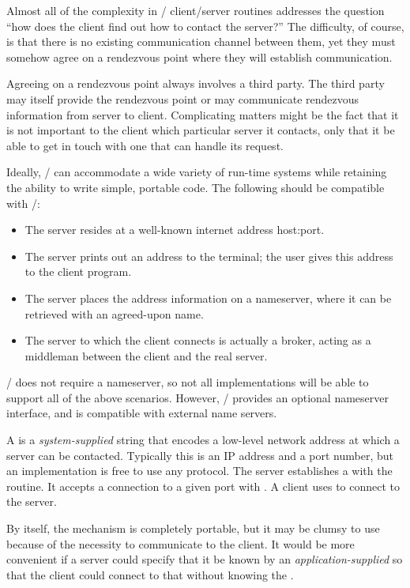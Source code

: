 Almost all of the complexity in \MPI/ client/server routines
addresses the question ``how does the client find out how
to contact the server?''
The difficulty, of course, is that there is no existing
communication channel between them, yet they must somehow agree
on a rendezvous point where they will establish communication.

Agreeing on a rendezvous point always involves a third party.
The third party may itself provide the rendezvous point or may
communicate rendezvous information from server to client.
Complicating
matters might be the fact that it is not important to the client
which particular server it contacts, only that it be able to get in touch
with one that can handle its request.

Ideally, \MPI/ can accommodate
 a wide variety of run-time systems while
retaining the ability to write simple, portable code. The following
should be compatible with \MPI/:

\begin{itemize}
\item The server resides at a well-known internet address host:port.
\item The server prints out an address to the terminal;
the user gives this address to the client program.
\item The server places the address information on a nameserver,
where it can be retrieved with an agreed-upon name.
\item The server to which the client connects is actually
a broker, acting as a middleman between the client and the
real server.
\end{itemize}


\MPI/ does not require a nameserver, so not all implementations
will be able to support all of the above scenarios. However,
\MPI/ provides an optional nameserver interface, and is compatible
with external name servers.

A  is a \emph{system-supplied} string that encodes a
low-level network address at which a server can be
contacted. Typically this is an IP address and a port number, but an
implementation is free to use any protocol.
The server establishes a  with the
 routine. It accepts a
connection to a given port with .
A client uses  to connect to the server.

By itself, the  mechanism is
completely portable, but it may be clumsy to use because
of the necessity to communicate  to
the client. It would be more convenient if a server could specify that
it be known by an \emph{application-supplied}  so
that the client could connect to that 
without knowing the .

